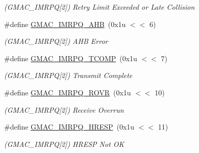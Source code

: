 \begin{DoxyCompactItemize}
\begin{DoxyCompactList}\small\item\em (G\+M\+A\+C\+\_\+\+I\+M\+R\+PQ\mbox{[}2\mbox{]}) Retry Limit Exceeded or Late Collision \end{DoxyCompactList}\item 
\mbox{\label{group__SAMV71__GMAC_ga27358355df4d424999b6da117b4ce991}} 
\#define \mbox{\hyperlink{group__SAMV71__GMAC_ga27358355df4d424999b6da117b4ce991}{G\+M\+A\+C\+\_\+\+I\+M\+R\+P\+Q\+\_\+\+A\+HB}}~(0x1u $<$$<$ 6)
\begin{DoxyCompactList}\small\item\em (G\+M\+A\+C\+\_\+\+I\+M\+R\+PQ\mbox{[}2\mbox{]}) A\+HB Error \end{DoxyCompactList}\item 
\mbox{\label{group__SAMV71__GMAC_ga292feecb9454427b62804f647e5508a0}} 
\#define \mbox{\hyperlink{group__SAMV71__GMAC_ga292feecb9454427b62804f647e5508a0}{G\+M\+A\+C\+\_\+\+I\+M\+R\+P\+Q\+\_\+\+T\+C\+O\+MP}}~(0x1u $<$$<$ 7)
\begin{DoxyCompactList}\small\item\em (G\+M\+A\+C\+\_\+\+I\+M\+R\+PQ\mbox{[}2\mbox{]}) Transmit Complete \end{DoxyCompactList}\item 
\mbox{\label{group__SAMV71__GMAC_gadc8277962b306b723ef390a824a05c12}} 
\#define \mbox{\hyperlink{group__SAMV71__GMAC_gadc8277962b306b723ef390a824a05c12}{G\+M\+A\+C\+\_\+\+I\+M\+R\+P\+Q\+\_\+\+R\+O\+VR}}~(0x1u $<$$<$ 10)
\begin{DoxyCompactList}\small\item\em (G\+M\+A\+C\+\_\+\+I\+M\+R\+PQ\mbox{[}2\mbox{]}) Receive Overrun \end{DoxyCompactList}\item 
\mbox{\label{group__SAMV71__GMAC_ga78c858ae4cc7578674ca1ac86b9b9a16}} 
\#define \mbox{\hyperlink{group__SAMV71__GMAC_ga78c858ae4cc7578674ca1ac86b9b9a16}{G\+M\+A\+C\+\_\+\+I\+M\+R\+P\+Q\+\_\+\+H\+R\+E\+SP}}~(0x1u $<$$<$ 11)
\begin{DoxyCompactList}\small\item\em (G\+M\+A\+C\+\_\+\+I\+M\+R\+PQ\mbox{[}2\mbox{]}) H\+R\+E\+SP Not OK \end{DoxyCompactList}\item 

\end{DoxyCompactItemize}
